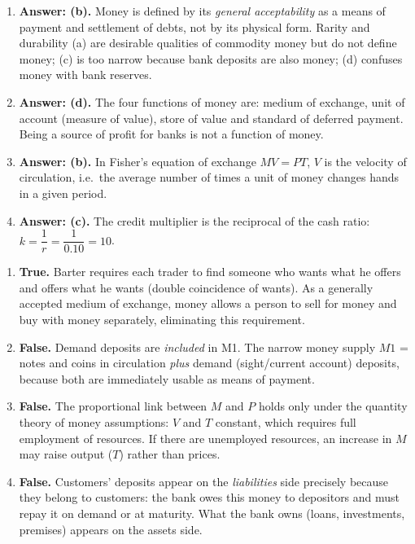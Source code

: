 \documentclass[11pt]{article}
\newcommand{\cle}[1]{{\popxbold\color{popdark}#1}}
\begin{document}
\begin{corrige}
\begin{enumerate}
\item \textbf{Answer: (b).} Money is defined by its \emph{general acceptability} as a means of payment and settlement of debts, not by its physical form. Rarity and durability (a) are desirable qualities of commodity money but do not define money; (c) is too narrow because bank deposits are also money; (d) confuses money with bank reserves.
\item \textbf{Answer: (d).} The four functions of money are: \cle{medium of exchange}, \cle{unit of account} (measure of value), \cle{store of value} and \cle{standard of deferred payment}. Being a source of profit for banks is not a function of money.
\item \textbf{Answer: (b).} In Fisher's equation of exchange $MV = PT$, $V$ is the \cle{velocity of circulation}, i.e.\ the average number of times a unit of money changes hands in a given period.
\item \textbf{Answer: (c).} The \cle{credit multiplier} is the reciprocal of the cash ratio: $k = \dfrac{1}{r} = \dfrac{1}{0.10} = 10$.
\end{enumerate}
\end{corrige}

\begin{corrige}
\begin{enumerate}
\item \textbf{True.} Barter requires each trader to find someone who wants what he offers and offers what he wants (\cle{double coincidence of wants}). As a generally accepted \cle{medium of exchange}, money allows a person to sell for money and buy with money separately, eliminating this requirement.
\item \textbf{False.} Demand deposits are \emph{included} in \cle{M1}. The narrow money supply $M1$ = notes and coins in circulation \emph{plus} demand (sight/current account) deposits, because both are immediately usable as means of payment.
\item \textbf{False.} The proportional link between $M$ and $P$ holds only under the \cle{quantity theory of money} assumptions: $V$ and $T$ constant, which requires full employment of resources. If there are unemployed resources, an increase in $M$ may raise output ($T$) rather than prices.
\item \textbf{False.} Customers' deposits appear on the \emph{liabilities} side precisely because they belong to customers: the bank owes this money to depositors and must repay it on demand or at maturity. What the bank owns (loans, investments, premises) appears on the assets side.
\end{enumerate}
\end{corrige}
\end{document}

